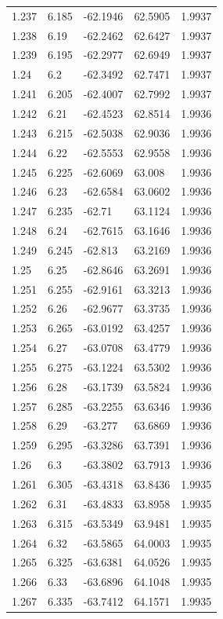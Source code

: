 \begin{tabular}{lllll}
1.237 & 6.185 & -62.1946 & 62.5905 & 1.9937 \\
1.238 & 6.19 & -62.2462 & 62.6427 & 1.9937 \\
1.239 & 6.195 & -62.2977 & 62.6949 & 1.9937 \\
1.24 & 6.2 & -62.3492 & 62.7471 & 1.9937 \\
1.241 & 6.205 & -62.4007 & 62.7992 & 1.9937 \\
1.242 & 6.21 & -62.4523 & 62.8514 & 1.9936 \\
1.243 & 6.215 & -62.5038 & 62.9036 & 1.9936 \\
1.244 & 6.22 & -62.5553 & 62.9558 & 1.9936 \\
1.245 & 6.225 & -62.6069 & 63.008 & 1.9936 \\
1.246 & 6.23 & -62.6584 & 63.0602 & 1.9936 \\
1.247 & 6.235 & -62.71 & 63.1124 & 1.9936 \\
1.248 & 6.24 & -62.7615 & 63.1646 & 1.9936 \\
1.249 & 6.245 & -62.813 & 63.2169 & 1.9936 \\
1.25 & 6.25 & -62.8646 & 63.2691 & 1.9936 \\
1.251 & 6.255 & -62.9161 & 63.3213 & 1.9936 \\
1.252 & 6.26 & -62.9677 & 63.3735 & 1.9936 \\
1.253 & 6.265 & -63.0192 & 63.4257 & 1.9936 \\
1.254 & 6.27 & -63.0708 & 63.4779 & 1.9936 \\
1.255 & 6.275 & -63.1224 & 63.5302 & 1.9936 \\
1.256 & 6.28 & -63.1739 & 63.5824 & 1.9936 \\
1.257 & 6.285 & -63.2255 & 63.6346 & 1.9936 \\
1.258 & 6.29 & -63.277 & 63.6869 & 1.9936 \\
1.259 & 6.295 & -63.3286 & 63.7391 & 1.9936 \\
1.26 & 6.3 & -63.3802 & 63.7913 & 1.9936 \\
1.261 & 6.305 & -63.4318 & 63.8436 & 1.9935 \\
1.262 & 6.31 & -63.4833 & 63.8958 & 1.9935 \\
1.263 & 6.315 & -63.5349 & 63.9481 & 1.9935 \\
1.264 & 6.32 & -63.5865 & 64.0003 & 1.9935 \\
1.265 & 6.325 & -63.6381 & 64.0526 & 1.9935 \\
1.266 & 6.33 & -63.6896 & 64.1048 & 1.9935 \\
1.267 & 6.335 & -63.7412 & 64.1571 & 1.9935 \\

\end{tabular}
